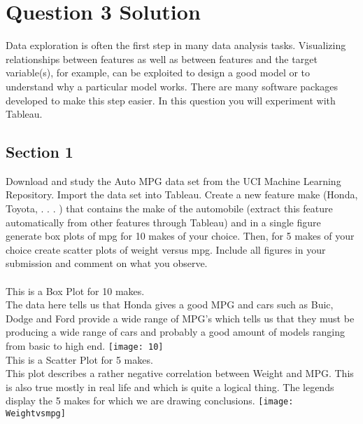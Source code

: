 \documentclass[12pt,a4paper,titlepage]{article}
\begin{document}
{{\section{Question 3 Solution}{
Data exploration is often the first step in many data analysis tasks. Visualizing relationships between features as well as between features and the target variable(s), for example, can be exploited to design a good model or to understand why a particular model works. There are many software packages developed to make this step easier. In this question you will experiment with Tableau.
\subsection{Section 1}{
Download and study the Auto MPG data set from the UCI Machine Learning Repository.
Import the data set into Tableau. Create a new feature make (Honda, Toyota, . . . ) that contains the make of the automobile (extract this feature automatically from other features through Tableau) and in a single figure generate box plots of mpg for 10 makes of your choice. Then, for 5 makes of your choice create scatter plots of weight versus mpg. Include all figures in your submission and comment on what you observe.\\~\\

\centering
This is a Box Plot for 10 makes.\\
The data here tells us that Honda gives a good MPG and cars such as Buic, Dodge and Ford provide a wide range of MPG's which tells us that they must be producing a wide range of cars and probably a good amount of models ranging from basic to high end.
\texttt{[image: 10]}\\
This is a Scatter Plot for 5 makes.\\
This plot describes a rather negative correlation between Weight and MPG. This is also true mostly in real life and which is quite a logical thing. The legends display the 5 makes for which we are drawing conclusions.
\texttt{[image: Weightvsmpg]}\\

}


}}}
\end{document}
